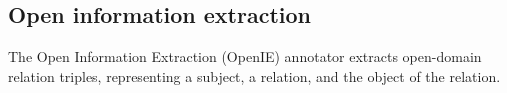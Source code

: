 \subsection{Open information extraction}
The Open Information Extraction (OpenIE) annotator extracts open-domain relation triples, representing a subject, a relation, and the object of the relation. 